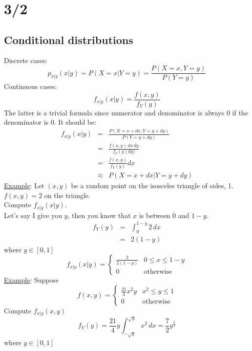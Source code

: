 \section*{3/2}
  \subsection*{Conditional distributions}
    Discrete cases:
    $$
      p_{x|y}(x|y) = P(X=x | Y=y) = \frac{P(X=x,Y=y)}{P(Y=y)}
    $$
    Continuous cases:
    $$
      f_{x|y}(x|y) = \frac{f(x,y)}{f_Y(y)}
    $$
    The latter is a trivial formula since numerator and denominator is always
    0 if the denominator is $0$.
    It should be:
    \begin{eqnarray*}
      f_{x|y}(x|y) &=& \frac{P(X = x+dx, Y=y+dy)}{P(Y=y + dy)}\\
        & = & \frac{f(x,y)\,dx\,dy}{f_Y(y)dy)}\\
        & = & \frac{f(x,y)}{f_Y(y)}dx\\
        & \approx & P(X = x + dx| Y = y + dy)
    \end{eqnarray*}
    \underline{Example}: Let $(x,y)$ be a random point on the isosceles triangle
      of sides, 1.\\
      $f(x,y) = 2$ on the triangle.\\
      Compute $f_{x|y}(x|y)$.\\
      Let's say I give you $y$, then you know that $x$ is between 0 and $1-y$.\\
      \begin{eqnarray*}
        f_Y(y) & = & \int_{0} ^{1-y} 2\,dx\\
          & = & 2(1-y)
      \end{eqnarray*}
      where $y \in [0,1]$\\
      $$
        f_{x|y}(x|y) = \begin{cases}\frac{2}{2(1-y)} & 0 \le x \le 1 - y\\
        0 & \text{otherwise}\end{cases}
      $$
    \underline{Example}: Suppose
    $$
      f(x,y) = \begin{cases} \frac{21}{4}x^2y & x^2 \le y \le 1\\ 
      0 &\text{otherwise}\end{cases}
    $$
    Compute $f_{x|y}(x,y)$\\
    $$
      f_Y(y) = \frac{21}{4} y\int_{-\sqrt{y}}^{\sqrt{y}} x^2\,dx = \frac{7}{2}
      y^{\frac{5}{2}}
    $$
    where $y \in [0,1]$\\
